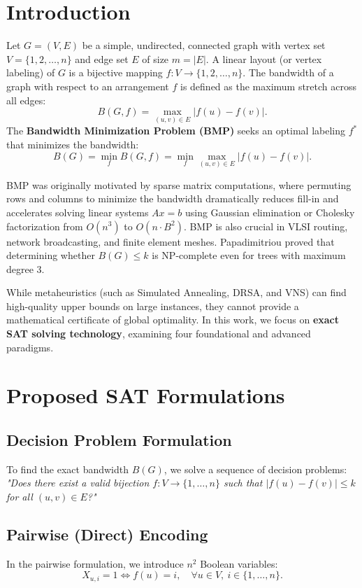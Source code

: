 \documentclass[a4paper,fleqn]{cas-sc}
\begin{document}
\section{Introduction}
Let $G = (V, E)$ be a simple, undirected, connected graph with vertex set $V = \{1, 2, \dots, n\}$ and edge set $E$ of size $m = |E|$. A linear layout (or vertex labeling) of $G$ is a bijective mapping $f: V \to \{1, 2, \dots, n\}$. The bandwidth of a graph with respect to an arrangement $f$ is defined as the maximum stretch across all edges:
\begin{equation}
B(G, f) = \max_{(u, v) \in E} |f(u) - f(v)|.
\end{equation}
The \textbf{Bandwidth Minimization Problem (BMP)} seeks an optimal labeling $f^*$ that minimizes the bandwidth:
\begin{equation}
B(G) = \min_{f} B(G, f) = \min_{f} \max_{(u, v) \in E} |f(u) - f(v)|.
\end{equation}

BMP was originally motivated by sparse matrix computations, where permuting rows and columns to minimize the bandwidth dramatically reduces fill-in and accelerates solving linear systems $Ax = b$ using Gaussian elimination or Cholesky factorization from $O(n^3)$ to $O(n \cdot B^2)$. BMP is also crucial in VLSI routing, network broadcasting, and finite element meshes. Papadimitriou proved that determining whether $B(G) \le k$ is NP-complete even for trees with maximum degree 3. 

While metaheuristics (such as Simulated Annealing, DRSA, and VNS) can find high-quality upper bounds on large instances, they cannot provide a mathematical certificate of global optimality. In this work, we focus on \textbf{exact SAT solving technology}, examining four foundational and advanced paradigms.

\section{Proposed SAT Formulations}

\subsection{Decision Problem Formulation}
To find the exact bandwidth $B(G)$, we solve a sequence of decision problems: \textit{"Does there exist a valid bijection $f: V \to \{1, \dots, n\}$ such that $|f(u) - f(v)| \le k$ for all $(u, v) \in E$?"}

\subsection{Pairwise (Direct) Encoding}
In the pairwise formulation, we introduce $n^2$ Boolean variables:
\begin{equation}
X_{u, i} = 1 \iff f(u) = i, \quad \forall u \in V, \ i \in \{1, \dots, n\}.
\end{equation}
\end{document}

